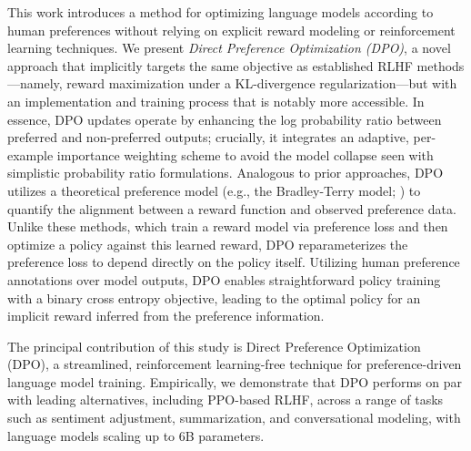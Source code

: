 This work introduces a method for optimizing language models according to human preferences without relying on explicit reward modeling or reinforcement learning techniques. We present \textit{Direct Preference Optimization (DPO)}, a novel approach that implicitly targets the same objective as established RLHF methods—namely, reward maximization under a KL-divergence regularization—but with an implementation and training process that is notably more accessible. In essence, DPO updates operate by enhancing the log probability ratio between preferred and non-preferred outputs; crucially, it integrates an adaptive, per-example importance weighting scheme to avoid the model collapse seen with simplistic probability ratio formulations. Analogous to prior approaches, DPO utilizes a theoretical preference model (e.g., the Bradley-Terry model; \cite{bradley1952rankanalysis}) to quantify the alignment between a reward function and observed preference data. Unlike these methods, which train a reward model via preference loss and then optimize a policy against this learned reward, DPO reparameterizes the preference loss to depend directly on the policy itself. Utilizing human preference annotations over model outputs, DPO enables straightforward policy training with a binary cross entropy objective, leading to the optimal policy for an implicit reward inferred from the preference information.

The principal contribution of this study is Direct Preference Optimization (DPO), a streamlined, reinforcement learning-free technique for preference-driven language model training. Empirically, we demonstrate that DPO performs on par with leading alternatives, including PPO-based RLHF, across a range of tasks such as sentiment adjustment, summarization, and conversational modeling, with language models scaling up to 6B parameters.

